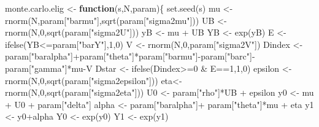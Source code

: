 \documentclass[
]{book}
\newenvironment{Shaded}{\begin{snugshade}}{\end{snugshade}}
\newcommand{\ControlFlowTok}[1]{\textcolor[rgb]{0.13,0.29,0.53}{\textbf{#1}}}
\newcommand{\DecValTok}[1]{\textcolor[rgb]{0.00,0.00,0.81}{#1}}
\newcommand{\FunctionTok}[1]{\textcolor[rgb]{0.00,0.00,0.00}{#1}}
\newcommand{\NormalTok}[1]{#1}
\newcommand{\OtherTok}[1]{\textcolor[rgb]{0.56,0.35,0.01}{#1}}
\newcommand{\SpecialCharTok}[1]{\textcolor[rgb]{0.00,0.00,0.00}{#1}}
\newcommand{\StringTok}[1]{\textcolor[rgb]{0.31,0.60,0.02}{#1}}
\theoremstyle{definition}
\theoremstyle{definition}
\theoremstyle{definition}
\theoremstyle{definition}
\theoremstyle{remark}
\begin{document}
\begin{Shaded}
\begin{Highlighting}[]
\NormalTok{monte.carlo.elig }\OtherTok{\textless{}{-}} \ControlFlowTok{function}\NormalTok{(s,N,param)\{}
  \FunctionTok{set.seed}\NormalTok{(s)}
\NormalTok{  mu }\OtherTok{\textless{}{-}} \FunctionTok{rnorm}\NormalTok{(N,param[}\StringTok{"barmu"}\NormalTok{],}\FunctionTok{sqrt}\NormalTok{(param[}\StringTok{"sigma2mu"}\NormalTok{]))}
\NormalTok{  UB }\OtherTok{\textless{}{-}} \FunctionTok{rnorm}\NormalTok{(N,}\DecValTok{0}\NormalTok{,}\FunctionTok{sqrt}\NormalTok{(param[}\StringTok{"sigma2U"}\NormalTok{]))}
\NormalTok{  yB }\OtherTok{\textless{}{-}}\NormalTok{ mu }\SpecialCharTok{+}\NormalTok{ UB }
\NormalTok{  YB }\OtherTok{\textless{}{-}} \FunctionTok{exp}\NormalTok{(yB)}
\NormalTok{  E }\OtherTok{\textless{}{-}} \FunctionTok{ifelse}\NormalTok{(YB}\SpecialCharTok{\textless{}=}\NormalTok{param[}\StringTok{"barY"}\NormalTok{],}\DecValTok{1}\NormalTok{,}\DecValTok{0}\NormalTok{)}
\NormalTok{  V }\OtherTok{\textless{}{-}} \FunctionTok{rnorm}\NormalTok{(N,}\DecValTok{0}\NormalTok{,param[}\StringTok{"sigma2V"}\NormalTok{])}
\NormalTok{  Dindex }\OtherTok{\textless{}{-}}\NormalTok{ param[}\StringTok{"baralpha"}\NormalTok{]}\SpecialCharTok{+}\NormalTok{param[}\StringTok{"theta"}\NormalTok{]}\SpecialCharTok{*}\NormalTok{param[}\StringTok{"barmu"}\NormalTok{]}\SpecialCharTok{{-}}\NormalTok{param[}\StringTok{"barc"}\NormalTok{]}\SpecialCharTok{{-}}\NormalTok{param[}\StringTok{"gamma"}\NormalTok{]}\SpecialCharTok{*}\NormalTok{mu}\SpecialCharTok{{-}}\NormalTok{V}
\NormalTok{  Dstar }\OtherTok{\textless{}{-}} \FunctionTok{ifelse}\NormalTok{(Dindex}\SpecialCharTok{\textgreater{}=}\DecValTok{0} \SpecialCharTok{\&}\NormalTok{ E}\SpecialCharTok{==}\DecValTok{1}\NormalTok{,}\DecValTok{1}\NormalTok{,}\DecValTok{0}\NormalTok{)}
\NormalTok{  epsilon }\OtherTok{\textless{}{-}} \FunctionTok{rnorm}\NormalTok{(N,}\DecValTok{0}\NormalTok{,}\FunctionTok{sqrt}\NormalTok{(param[}\StringTok{"sigma2epsilon"}\NormalTok{]))}
\NormalTok{  eta}\OtherTok{\textless{}{-}} \FunctionTok{rnorm}\NormalTok{(N,}\DecValTok{0}\NormalTok{,}\FunctionTok{sqrt}\NormalTok{(param[}\StringTok{"sigma2eta"}\NormalTok{]))}
\NormalTok{  U0 }\OtherTok{\textless{}{-}}\NormalTok{ param[}\StringTok{"rho"}\NormalTok{]}\SpecialCharTok{*}\NormalTok{UB }\SpecialCharTok{+}\NormalTok{ epsilon}
\NormalTok{  y0 }\OtherTok{\textless{}{-}}\NormalTok{ mu }\SpecialCharTok{+}\NormalTok{  U0 }\SpecialCharTok{+}\NormalTok{ param[}\StringTok{"delta"}\NormalTok{]}
\NormalTok{  alpha }\OtherTok{\textless{}{-}}\NormalTok{ param[}\StringTok{"baralpha"}\NormalTok{]}\SpecialCharTok{+}\NormalTok{  param[}\StringTok{"theta"}\NormalTok{]}\SpecialCharTok{*}\NormalTok{mu }\SpecialCharTok{+}\NormalTok{ eta}
\NormalTok{  y1 }\OtherTok{\textless{}{-}}\NormalTok{ y0}\SpecialCharTok{+}\NormalTok{alpha}
\NormalTok{  Y0 }\OtherTok{\textless{}{-}} \FunctionTok{exp}\NormalTok{(y0)}
\NormalTok{  Y1 }\OtherTok{\textless{}{-}} \FunctionTok{exp}\NormalTok{(y1)}
  

\end{Highlighting}
\end{Shaded}
\end{document}
